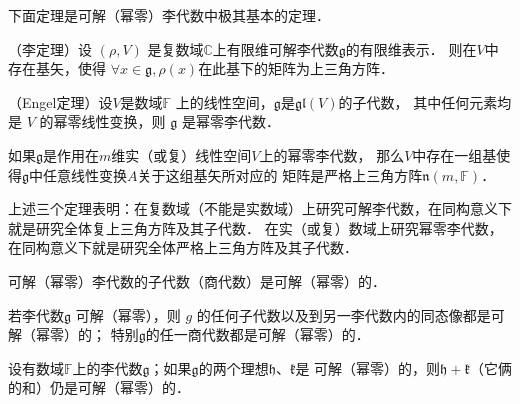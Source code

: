 下面定理是可解（幂零）李代数中极其基本的定理．


\begin{theorem}\label{chlg:thm_Lie}
    （李定理）设 $(\rho, V)$ 是复数域$\mathbb{C}$上有限维可解李代数$\mathfrak{g}$的有限维表示．
    则在$V$中存在基矢，使得 $\forall x \in \mathfrak{g}, \rho(x)$在此基下的矩阵为上三角方阵．
\end{theorem}


\begin{theorem}\label{chlg:thm_Engel}
    （Engel定理）设$V$是数域$\mathbb{F}$ 上的线性空间，$\mathfrak{g}$是$\mathfrak{gl}(V)$的子代数，
    其中任何元素均是 $V$ 的幂零线性变换，则 $\mathfrak{g}$ 是幂零李代数．
\end{theorem}


\begin{theorem}
    如果$\mathfrak{g}$是作用在$m$维实（或复）线性空间$V$上的幂零李代数，
    那么$V$中存在一组基使得$\mathfrak{g}$中任意线性变换$A$关于这组基矢所对应的
    矩阵是严格上三角方阵$\mathfrak{n}(m,\mathbb{F})$．
\end{theorem}

上述三个定理表明：在复数域（不能是实数域）上研究可解李代数，在同构意义下就是研究全体复上三角方阵及其子代数．
在实（或复）数域上研究幂零李代数，在同构意义下就是研究全体严格上三角方阵及其子代数．




\begin{proposition}
    可解（幂零）李代数的子代数（商代数）是可解（幂零）的．
\end{proposition}

\begin{proposition}
    若李代数$\mathfrak{g}$ 可解（幂零），则 $g$ 的任何子代数以及到另一李代数内的同态像都是可解（幂零）的；
    特别$\mathfrak{g}$的任一商代数都是可解（幂零）的．
\end{proposition}

\begin{proposition}\label{chlg:thm_isnosn}
    设有数域$\mathbb{F}$上的李代数$\mathfrak{g}$；如果$\mathfrak{g}$的两个理想$\mathfrak{h}$、$\mathfrak{k}$是
    可解（幂零）的，则$\mathfrak{h}+\mathfrak{k}$（它俩的和）仍是可解（幂零）的．
\end{proposition}





 

